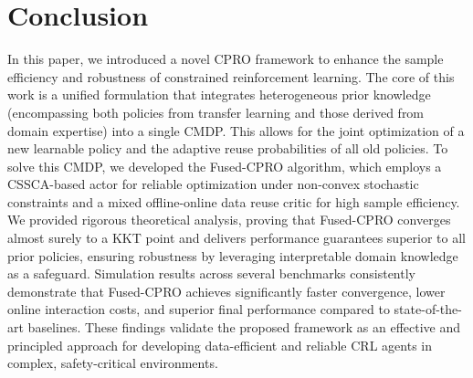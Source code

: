 \documentclass{IEEEtran}
\begin{document}
\section{Conclusion}
In this paper, we introduced a novel CPRO framework to enhance the sample efficiency and robustness of constrained reinforcement learning. The core of this work is a unified formulation that integrates heterogeneous prior knowledge (encompassing both policies from transfer learning and those derived from domain expertise) into a single CMDP. This allows for the joint optimization of a new learnable policy and the adaptive reuse probabilities of all old policies. To solve this CMDP, we developed the Fused-CPRO algorithm, which employs a CSSCA-based actor for reliable optimization under non-convex stochastic constraints and a mixed offline-online data reuse critic for high sample efficiency. We provided rigorous theoretical analysis, proving that Fused-CPRO converges almost surely to a KKT point and delivers performance guarantees superior to all prior policies, ensuring robustness by leveraging interpretable domain knowledge as a safeguard. Simulation results across several benchmarks consistently demonstrate that Fused-CPRO achieves significantly faster convergence, lower online interaction costs, and superior final performance compared to state-of-the-art baselines. These findings validate the proposed framework as an effective and principled approach for developing data-efficient and reliable CRL agents in complex, safety-critical environments.
\appendices
\end{document}
